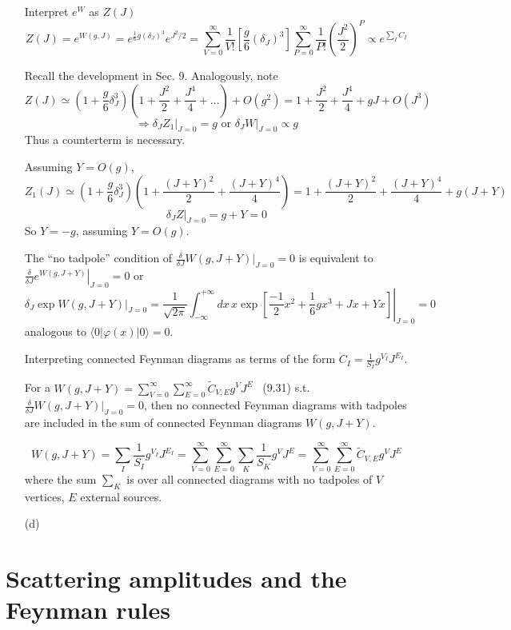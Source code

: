 \documentclass[twoside]{amsart}
\begin{document}
\begin{itemize}
Interpret $e^W$ as $Z(J)$
\[
Z(J) = e^{ W(g,J) } = e^{ \frac{1}{6} g ( \delta_J )^3 } e^{ J^2/ 2}  = \sum_{V=0}^{\infty} \frac{1}{V!} \left[ \frac{ g}{6} (\delta_J)^3 \right] \sum_{P=0}^{\infty} \frac{1}{P!} \left( \frac{J^2 }{2} \right)^P \propto e^{\sum_I C_I}
\]

Recall the development in Sec. 9.  Analogously, note
\[
Z(J) \simeq \left( 1 + \frac{g}{6} \delta_J^3 \right)\left( 1 + \frac{J^2}{2} + \frac{J^4}{4}  + \dots \right) + O(g^2) = 1 + \frac{J^2}{2} + \frac{J^4}{4} + gJ + O(J^3) 
\]
\[
\Longrightarrow \left. \delta_J Z_1 \right|_{J=0} = g \text{ or } \delta_J \left. W \right|_{J=0} \propto g 
\]
Thus a counterterm is necessary.  

Assuming $Y = O(g)$,
\[
Z_1(J) \simeq  \left( 1 + \frac{g}{6} \delta_J^3 \right) \left( 1 + \frac{ (J+Y)^2 }{2} + \frac{ (J+Y)^4}{4} \right) = 1 + \frac{ (J+Y)^2}{2} + \frac{ (J+Y)^4}{4} + g(J+Y)
\]
\[
 \left. \delta_J Z \right|_{J=0} = g + Y = 0 
\]
So $Y = - g$, assuming $Y = O(g)$.  

The ``no tadpole'' condition of $\frac{ \delta}{\delta J} \left. W(g,J+Y) \right|_{J=0} =0$ is equivalent to $\left. \frac{ \delta}{\delta J} e^{ W(g,J+Y) } \right|_{J= 0} = 0$ or 
\[
\delta_J \left. \exp{  W(g,J+Y) } \right|_{J=0} = \left. \frac{1}{ \sqrt{ 2 \pi }} \int_{-\infty}^{+\infty} dx \, x \exp{ \left[ \frac{-1}{2} x^2 + \frac{1}{6} gx^3 + Jx + Yx \right] } \right|_{J=0 } = 0 
\]
analogous to $\langle 0 | \varphi(x) | 0 \rangle = 0$.  

Interpreting connected Feynman diagrams as terms of the form $C_I = \frac{1}{S_I} g^{V_I} J^{E_I}$.  

For a $W(g,J + Y) = \sum_{V=0}^{\infty} \sum_{E=0}^{\infty} \widetilde{C}_{V,E} g^V J^E$  \quad \, (9.31) s.t. $ \frac{ \delta}{ \delta J}\left. W(g, J+Y) \right|_{J=0} = 0$, then no connected Feynman diagrams with tadpoles are included in the sum of connected Feynman diagrams $W(g,J+Y)$.  

\[
W(g,J+Y) = \sum_I \frac{1}{S_I} g^{V_I} J^{E_I} = \sum_{V=0}^{\infty} \sum_{E=0}^{\infty} \sum_K \frac{1}{ S_K} g^V J^E = \sum_{V=0}^{\infty} \sum_{E=0}^{\infty} \widetilde{C}_{V,E} g^V J^E
\]
where the sum $\sum_K$ is over all connected diagrams with no tadpoles of $V$ vertices, $E$ external sources.  

\item[(d)]
\end{itemize}


\section{Scattering amplitudes and the Feynman rules} 
\end{document}
